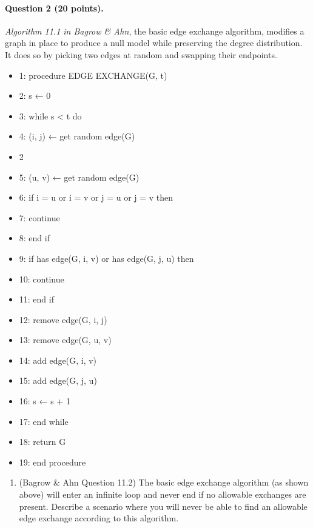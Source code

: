 \documentclass[11pt]{article}
\providecommand{\tightlist}{%
      \setlength{\itemsep}{0pt}\setlength{\parskip}{0pt}}
\begin{document}
    \paragraph{Question 2 (20 points).}\label{question-2-20-points.}

\emph{Algorithm 11.1 in Bagrow \& Ahn}, the basic edge exchange
algorithm, modifies a graph in place to produce a null model while
preserving the degree distribution. It does so by picking two edges at
random and swapping their endpoints.

    \begin{itemize}
\tightlist
\item
  1: procedure EDGE EXCHANGE(G, t)
\item
  2: s ← 0
\item
  3: while s \textless{} t do
\item
  4: (i, j) ← get random edge(G)
\item
  2
\item
  5: (u, v) ← get random edge(G)
\item
  6: if i = u or i = v or j = u or j = v then
\item
  7: continue
\item
  8: end if
\item
  9: if has edge(G, i, v) or has edge(G, j, u) then
\item
  10: continue
\item
  11: end if
\item
  12: remove edge(G, i, j)
\item
  13: remove edge(G, u, v)
\item
  14: add edge(G, i, v)
\item
  15: add edge(G, j, u)
\item
  16: s ← s + 1
\item
  17: end while
\item
  18: return G
\item
  19: end procedure
\end{itemize}

    \begin{enumerate}
\def\labelenumi{(\alph{enumi})}
\tightlist
\item
  (Bagrow \& Ahn Question 11.2) The basic edge exchange algorithm (as
  shown above) will enter an infinite loop and never end if no allowable
  exchanges are present. Describe a scenario where you will never be
  able to find an allowable edge exchange according to this algorithm.
\end{enumerate}
\end{document}
